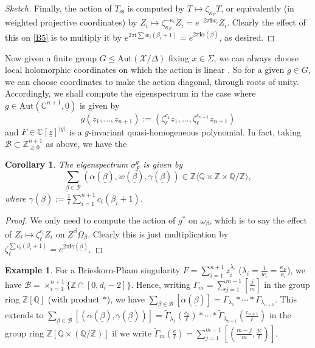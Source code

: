 \documentclass[12pt,letterpaper,english]{amsart}
\numberwithin{equation}{section}
\numberwithin{figure}{section}
\theoremstyle{plain}
\theoremstyle{remark}
\theoremstyle{definition}
\theoremstyle{definition}
\newtheorem{example}[equation]{Example}
\theoremstyle{plain}
\newtheorem{cor}[equation]{Corollary}
\theoremstyle{plain}
\theoremstyle{plain}
\theoremstyle{plain}
\theoremstyle{definition}
\def\uo{\underline{0}}
\def\ay{\mathbb{i}}
\def\QQ{\mathbb{Q}}
\def\CC{\mathbb{C}}
\def\ZZ{\mathbb{Z}}
\def\uz{\underline{z}}
\def\X{\mathcal{X}}
\def\ay{\mathbf{i}}
\def\ubb{\underline{\beta}}
\theoremstyle{definition}
\begin{document}
\begin{proof}[Sketch]
Finally, the action of $T_{\text{ss}}$ is computed by $T\mapsto \zeta_{\kappa_F}T$, or equivalently (in weighted projective coordinates) by $Z_i\mapsto \zeta_{\kappa_F}^{-\kappa_i}Z_i=e^{-2\pi\ay w_i}Z_i$.  Clearly the effect of this on \eqref{B5} is to multiply it by $e^{2\pi\ay\sum w_i(\beta_i+1)}=e^{2\pi\ay\alpha(\underline{\beta})}$, as desired.
\end{proof}

Now given a finite group $G\leq \mathrm{Aut}(\X/\Delta)$ fixing $x\in \Sigma$, we can always choose local holomorphic coordinates on which the action is linear \cite{Ca}.  So for a given $g\in G$, we can choose coordinates to make the action diagonal, through roots of unity. Accordingly, we shall compute the eigenspectrum in the case where $g\in \mathrm{Aut}(\CC^{n+1},\uo)$ is given by
\begin{equation}\label{B6}
g(z_1,\ldots,z_{n+1}):=(\zeta_{\ell}^{c_1}z_1,\ldots,\zeta_{\ell}^{c_{n+1}}z_{n+1})	
\end{equation}
and $F\in \CC[\uz]^{\langle g\rangle}$ is a $g$-invariant quasi-homogeneous polynomial.  In fact, taking $\mathcal{B}\subset \ZZ^{n+1}_{\geq 0}$ as above, we have the

\begin{cor}\label{B7}
The eigenspectrum $\sigma_F^g$ is given by
$$\sum_{\underline{\beta}\in \mathcal{B}}(\alpha(\underline{\beta}),w(\underline{\beta}),\gamma(\underline{\beta}))\in \ZZ\langle \QQ\times\ZZ\times\QQ/\ZZ\rangle,$$	
where $\gamma(\underline{\beta}):=\frac{1}{\ell}\sum_{i=1}^{n+1}c_i(\beta_i+1)$.
\end{cor}
\begin{proof}
We only need to compute the action of $g^*$ on $\omega_{\underline{\beta}}$, which is to say the effect of $Z_i\mapsto \zeta_{\ell}^{c_i}Z_i$ on $\underline{Z}^{\underline{\beta}}\Omega_{\underline{\beta}}$.  Clearly this is just multiplication by $\zeta_{\ell}^{\sum c_i(\beta_i+1)}=e^{2\pi\ay\gamma(\underline{\beta})}$.	
\end{proof}

\begin{example}\label{B8}
For a Brieskorn-Pham singularity $F=\sum_{i=1}^{n+1}z_i^{\lambda_i}$ ($\lambda_i=\tfrac{1}{w_i}=\tfrac{\kappa_F}{\kappa_i}$), we have $\mathcal{B}=\times_{i=1}^{n+1}\{\ZZ\cap[0,d_i-2]\}$.  Hence, writing $\Gamma_m=\sum_{j=1}^{m-1}[\tfrac{j}{m}]$ in the group ring $\ZZ[\QQ]$ (with product $*$), we have $\sum_{\underline{\beta}\in \mathcal{B}}[\alpha(\underline{\beta})]=\Gamma_{\lambda_1}*\cdots*\Gamma_{\lambda_{n+1}}$. This extends to $\sum_{\underline{\beta}\in \mathcal{B}}[(\alpha(\ubb),\gamma(\ubb))]=\widetilde{\Gamma}_{\lambda_1}(\tfrac{c_1}{\ell})*\cdots*\widetilde{\Gamma}_{\lambda_{n+1}}(\tfrac{c_{n+1}}{\ell})$ in the group ring $\ZZ[\QQ\times(\QQ/\ZZ)]$ if we write $\widetilde{\Gamma}_m(\tfrac{c}{\ell})=\sum_{j=1}^{m-1}[(\tfrac{m-j}{m},\tfrac{jc}{\ell})]$.	
\end{example}
\end{document}
